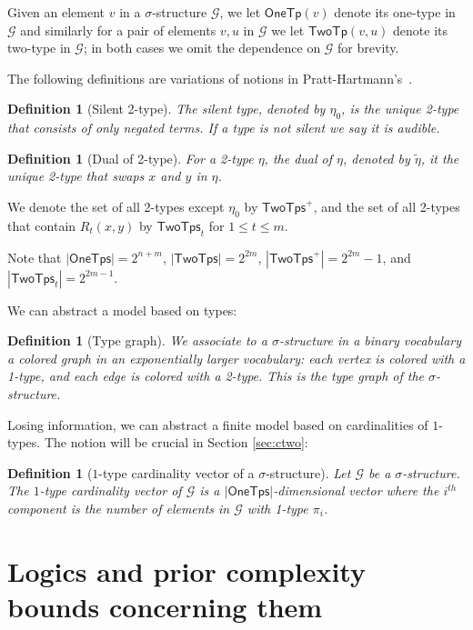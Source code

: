 \documentclass[10pt,a4paper]{article}
\newtheorem{definition}[theorem]{Definition}
\theoremstyle{definition}
\theoremstyle{remark}
\newcommand{\cG}{\mathcal{G}}
\newcommand{\vocab}{\sigma}
\newcommand{\onetypeof}{\mathsf{OneTp}}
\newcommand{\twotypeof}{\mathsf{TwoTp}}
\newcommand{\twotypes}{\mathsf{TwoTps}}
\newcommand{\onetypes}{\mathsf{OneTps}}
\newcommand{\Onetypes}{\mathsf{OneTps}}
\newcommand{\abs}[1]         {{\left| #1 \right|}}
\newcommand{\dual}[1] {\widetilde{ #1 }}
\newcommand{\etanull} {\eta_0}
\begin{document}
Given an element $v$ in a $\vocab$-structure $\cG$, we let $\onetypeof(v)$ denote its one-type in $\cG$
and similarly for a pair of elements $v, u$ in $\cG$ we let $\twotypeof(v,u)$ denote its two-type in $\cG$;
in both cases we omit the dependence on $\cG$ for brevity.

The following definitions are variations of notions
in Pratt-Hartmann's~\cite{ctwocomplexity,gctwocomplexity,ianrevisited}.

\begin{definition}[Silent 2-type]
    The \emph{silent type}, denoted by $\etanull$, is the unique 2-type that consists of only negated terms.
    If a type is not silent we say it is \emph{audible}.
\end{definition}

\begin{definition}[Dual of 2-type]
    For a 2-type $\eta$, the \emph{dual} of $\eta$, denoted by $\dual{\eta}$,
    it the unique 2-type that swaps $x$ and $y$ in $\eta$.
\end{definition}
We denote
the set of all 2-types except $\etanull$ by $\twotypes^+$, and
the set of all 2-types that contain $R_t(x, y)$ by $\twotypes_t$ for $1 \le t \le m$.

Note that $\abs{\Onetypes} = 2^{n+m}$,
$\abs{\twotypes} = 2^{2m}$, $\abs{\twotypes^+} = 2^{2m}-1$,
and $\abs{\twotypes_t} =2^{2m-1}$.

We can abstract a model based on types:
\begin{definition}[Type graph]
    We associate to a $\vocab$-structure in a binary vocabulary a colored graph in an exponentially larger vocabulary:
    each vertex is colored with a 1-type, and
    each edge is colored with a 2-type. This is the \emph{type graph} of the $\vocab$-structure.
\end{definition}

Losing information, we can abstract a finite model based on cardinalities of $1$-types. The notion will be crucial in Section \ref{sec:ctwo}:
\begin{definition}[$1$-type cardinality vector of a $\vocab$-structure] \label{def:cardboundvector}
    Let $\cG$ be a $\vocab$-structure.
    The $1$-type cardinality vector of $\cG$ is a $\abs{\onetypes}$-dimensional vector 
    where the $i^{th}$ component is the number of elements in $\cG$ with 1-type $\pi_i$.
\end{definition}



\section{Logics and prior complexity bounds concerning them}
\end{document}
